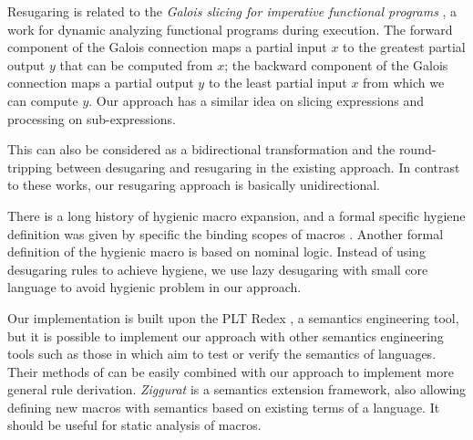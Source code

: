 Resugaring is related to the \emph{Galois slicing for imperative functional programs} \cite{slicing}, a work for dynamic analyzing functional programs during execution. The forward component of the Galois connection maps a partial input $x$ to the greatest partial output $y$ that can be computed from $x$; the backward component of the Galois connection maps a partial output $y$ to the least partial input $x$ from which we can compute $y$.
Our approach has a similar idea on slicing expressions and processing on sub-expressions.

This can also be considered as a bidirectional transformation \cite{bx,lens07} and the round-tripping between desugaring and resugaring in the existing approach. In contrast to these works, our resugaring approach is basically unidirectional. 


There is a long history of hygienic macro expansion\cite{hygienicmacro}, and a formal specific hygiene definition was given by specific the binding scopes of macros \cite{10.5555/1792878.1792884}. Another formal definition of the hygienic macro\cite{EssenceofHygiene} is based on nominal logic\cite{10.1007/s001650200016}. Instead of using desugaring rules to achieve hygiene, we use lazy desugaring with small core language to avoid hygienic problem in our approach.
%

Our implementation is built upon the PLT Redex \cite{SEwPR}, a semantics engineering tool, but it is possible to implement our approach with other semantics engineering tools such as those in \cite{dynsem,Ksemantic} which aim to test or verify the semantics of languages. Their methods of can be easily combined with our approach to implement more general rule derivation. \emph{Ziggurat} \cite{Ziggurat} is a semantics extension framework, also allowing defining new macros with semantics based on existing terms of a language. It should be useful for static analysis of macros.
